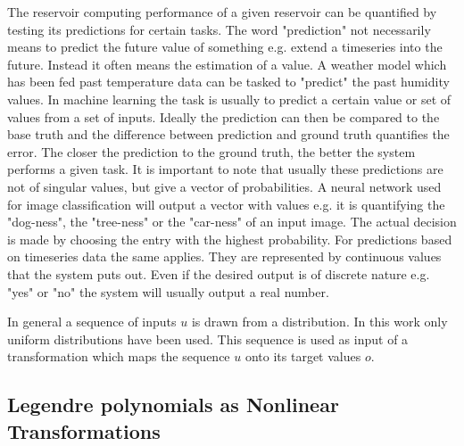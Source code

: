 The reservoir computing performance of a given reservoir can be quantified by testing its predictions for certain tasks. The word "prediction" not necessarily means to predict the future value of something e.g. extend a timeseries into the future. Instead it often means the estimation of a value. A weather model which has been fed past temperature data can be tasked to "predict" the past humidity values. In machine learning the task is usually to predict a certain value or set of values from a set of inputs. Ideally the prediction can then be compared to the base truth and the difference between prediction and ground truth quantifies the error. The closer the prediction to the ground truth, the better the system performs a given task. 
It is important to note that usually these predictions are not of singular values, but give a vector of probabilities. A neural network used for image classification will output a vector with values e.g. it is quantifying the "dog-ness", the "tree-ness" or the "car-ness" of an input image. The actual decision is made by choosing the entry with the highest probability. 
For predictions based on timeseries data the same applies. They are represented by continuous values that the system puts out. Even if the desired output is of discrete nature e.g. "yes" or "no" the system will usually output a real number. 

In general a sequence of inputs $u$ is drawn from a distribution. In this work only uniform distributions have been used. This sequence is used as input of a transformation which maps the sequence $u$ onto its target values $o$.


\subsection{Legendre polynomials as Nonlinear Transformations}

